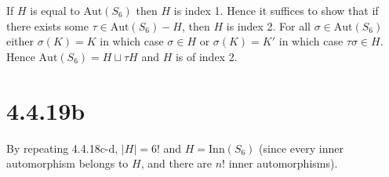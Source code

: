 \documentclass{article}
\def\Aut{\textrm{Aut}}
\def\Inn{\textrm{Inn}}
\begin{document}
If $H$ is equal to $\Aut(S_6)$ then $H$ is index 1. Hence it suffices to show that if there exists some $\tau \in \Aut(S_6) - H$, then $H$ is index 2. For all $\sigma \in \Aut(S_6)$ either $\sigma(K) = K$ in which case $\sigma \in H$ or $\sigma(K) = K'$ in which case $\tau\sigma \in H$. Hence $\Aut(S_6) = H \sqcup \tau H$ and $H$ is of index 2.

\section*{4.4.19b}

By repeating 4.4.18c-d, $|H| = 6!$ and $H = \Inn(S_6)$ (since every inner automorphism belongs to $H$, and there are $n!$ inner automorphisms).
\end{document}

